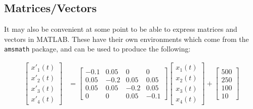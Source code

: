 \documentclass[11pt, twoside]{article}
\begin{document}

\subsection{Matrices/Vectors}

It may also be convenient at some point to be able to express matrices and vectors in MATLAB. These have their own environments which come from the \lstinline{amsmath} package, and can be used to produce the following:

\begin{align*}
    \begin{bmatrix}
        x'_1(t) \\
        x'_2(t) \\
        x'_3(t) \\
        x'_4(t)
    \end{bmatrix}
     & =
    \begin{bmatrix}
        -0.1 & 0.05 & 0    & 0    \\
        0.05 & -0.2 & 0.05 & 0.05 \\
        0.05 & 0.05 & -0.2 & 0.05 \\
        0    & 0    & 0.05 & -0.1
    \end{bmatrix}
    \begin{bmatrix}
        x_1(t) \\
        x_2(t) \\
        x_3(t) \\
        x_4(t)
    \end{bmatrix}
    +
    \begin{bmatrix}
        500 \\
        250 \\
        100 \\
        10
    \end{bmatrix}
\end{align*}
\end{document}
